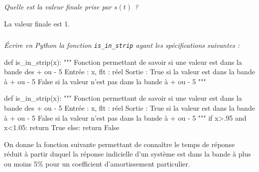 \documentclass[10pt,fleqn]{article} %
\begin{document}
\subparagraph{}
\textit{Quelle est la valeur finale prise par $s(t)$ ?} 
\ifprof
\begin{corrige}
La valeur finale est 1. 
\end{corrige}
\else



\fi


\subparagraph{}
\textit{Écrire en Python la fonction \texttt{is\_in\_strip} ayant les spécifications suivantes : } 
\ifprof
\else

\begin{py}
\begin{python}
def is_in_strip(x):
    """
    Fonction permettant de savoir si une valeur est dans la bande des + ou - 5%
    Entrée : 
        x, flt : réel
    Sortie : 
        True si la valeur est dans la bande à + ou - 5%
        False si la valeur n'est pas dans la bande à + ou - 5%
    """
\end{python}
\end{py}
\fi

\ifprof
\begin{corrige}
\begin{py}
\begin{python}
def is_in_strip(x):
    """
    Fonction permettant de savoir si une valeur est dans la bande des + ou - 5%
    Entrée : 
        x, flt : réel
    Sortie : 
        True si la valeur est dans la bande à + ou - 5%
        False si la valeur n'est pas dans la bande à + ou - 5%
    """
    if x>.95 and x<1.05:
        return True
    else:
        return False
\end{python}
\end{py}
\end{corrige}
\else
%
%
\fi

\ifprof
\else
\vspace{1cm}

On donne la fonction suivante permettant de connaître le temps de réponse réduit à partir duquel la réponse indicielle d'un système est dans la bande à plus ou moins 5\% pour un coefficient d'amortissement particulier.
\end{document}
